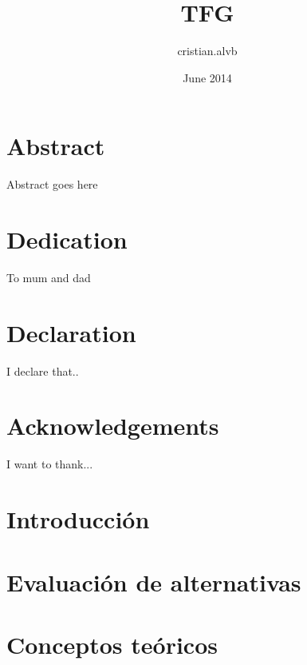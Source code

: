 \documentclass{report}
\title{TFG}
\author{cristian.alvb }
\date{June 2014}
\begin{document}
\maketitle

\chapter*{Abstract}
Abstract goes here

\chapter*{Dedication}
To mum and dad

\chapter*{Declaration}
I declare that..

\chapter*{Acknowledgements}
I want to thank...

\tableofcontents

\chapter{Introducción}
\label{chapter01}


\chapter{Evaluación de alternativas}
\label{chapter02}


\chapter{Conceptos teóricos}
\label{chapter03}


\printbibliography
\end{document}

